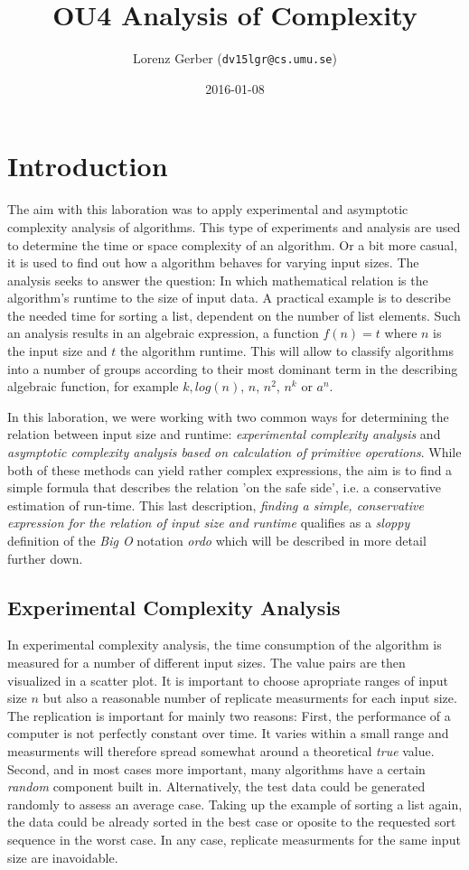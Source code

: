 \documentclass[a4paper,11pt,twoside]{article}
\title{OU4 Analysis of Complexity}
\author{Lorenz Gerber  ({\tt{dv15lgr@cs.umu.se}})}
\date{2016-01-08}
\begin{document}
\lstset{language=C}
\maketitle

\tableofcontents
\newpage

\section{Introduction} 
The aim with this laboration was to apply experimental and asymptotic
complexity analysis of algorithms. This type of experiments and
analysis are used to determine the time or space complexity of an 
algorithm. Or a bit more casual, it is used to find out how a
algorithm behaves for varying input sizes. The analysis seeks to 
answer the question: In which mathematical relation is
the algorithm's runtime to the size of input data. A practical 
example is to describe the needed time for sorting a list, dependent 
on the number of list elements. Such an analysis results in an algebraic
expression, a function $f(n) = t$ where $n$ is the input size and $t$
the algorithm runtime. This will allow to classify algorithms into a
number of groups according to their most dominant term in the 
describing algebraic function, for example $k, log(n)$, $n$, $n^2$, 
$n^k$ or $a^n$.

In this laboration, we were working with two common ways for
determining the relation between input size and runtime:
\emph{experimental complexity analysis} and \emph{asymptotic complexity analysis
based on calculation of primitive operations}. While both of these
methods can yield rather complex expressions, the aim is to find a
simple formula that describes the relation 'on the safe side', i.e. a
conservative estimation of run-time. This last description, \emph{finding
a simple, conservative expression for the relation of input size and
runtime} qualifies as a \emph{sloppy} definition of the \emph{Big O} 
notation \emph{ordo} which will be described in more detail further down.

\subsection{Experimental Complexity Analysis}
In experimental complexity analysis, the time consumption of the
algorithm is measured for a number of different input sizes. The value
pairs are then visualized in a scatter plot. It is important to choose
apropriate ranges of input size $n$ but also a reasonable number of
replicate measurments for each input size. 
The replication is important for mainly two reasons: First, the 
performance of a computer is not perfectly constant over time. 
It varies within a small range and measurments will
therefore spread somewhat around a theoretical \emph{true} value. Second,
and in most cases more important, many algorithms have a certain
\emph{random} component built in. Alternatively, the test data could be
generated randomly to assess an average case. Taking up the
example of sorting a list again, the data could be already sorted in the
best case or oposite to the requested sort sequence in the worst
case. In any case, replicate measurments for the same input size are
inavoidable.
\end{document}
